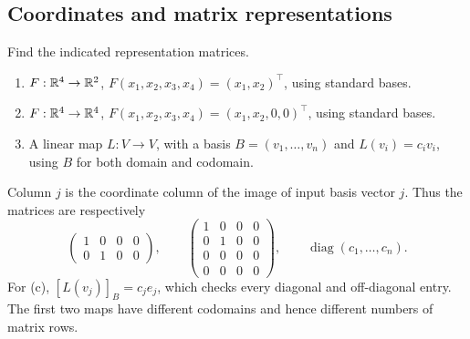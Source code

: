 \subsection*{Coordinates and matrix representations}

\begin{problem}\label{ex:04:representation-columns}
Find the indicated representation matrices.
\begin{enumerate}
\item \(F:\mathbb R^4\to\mathbb R^2\), \(F(x_1,x_2,x_3,x_4)=(x_1,x_2)^\top\),
using standard bases.
\item \(F:\mathbb R^4\to\mathbb R^4\), \(F(x_1,x_2,x_3,x_4)=(x_1,x_2,0,0)^\top\),
using standard bases.
\item A linear map \(L:V\to V\), with a basis \(B=(v_1,\ldots,v_n)\) and
\(L(v_i)=c_iv_i\), using \(B\) for both domain and codomain.
\end{enumerate}
\end{problem}
\begin{solution}
Column \(j\) is the coordinate column of the image of input basis vector \(j\).
Thus the matrices are respectively
\[
\begin{pmatrix}1&0&0&0\\0&1&0&0\end{pmatrix},\qquad
\begin{pmatrix}1&0&0&0\\0&1&0&0\\0&0&0&0\\0&0&0&0\end{pmatrix},\qquad
\operatorname{diag}(c_1,\ldots,c_n).
\]
For (c), \([L(v_j)]_B=c_je_j\), which checks every diagonal and off-diagonal entry.
The first two maps have different codomains and hence different numbers of matrix rows.
\end{solution}

